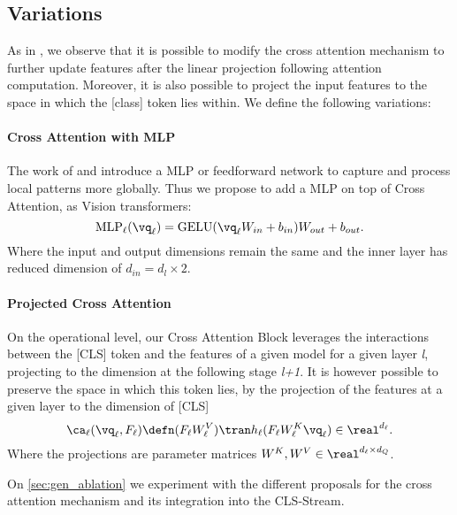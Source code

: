 \subsection{Variations}
\label{subsec:variations}

As in \cite{dosovitskiy2020image}, we observe that it is possible to modify the cross attention mechanism to further update features after the linear projection following attention computation. Moreover, it is also possible to project the input features to the space in which the [class] token lies within. We define the following variations:

\paragraph{Cross Attention with MLP}
The work of \cite{NIPS2017_3f5ee243} and \cite{dosovitskiy2020image} introduce a MLP or feedforward network to capture and process local patterns more globally. Thus we propose to add a MLP on top of Cross Attention, as Vision transformers:
\begin{equation}
    \mbox{MLP}_\ell(\vq_{\ell}) = \mbox{GELU}(\vq_\ell W_{in}+b_{in})W_{out}+b_{out}.
    \label{eq:mlp_ca}
\end{equation}
Where the input and output dimensions remain the same and the inner layer has reduced dimension of $d_{in} = d_l\times 2$.\\

\paragraph{Projected Cross Attention}
On the operational level, our Cross Attention Block leverages the interactions between the [CLS] token and the features of a given model for a given layer \textit{l}, projecting to the dimension at the following stage \textit{l+1}. It is however possible to preserve the space in which this token lies, by the projection of the features at a given layer to the dimension of [CLS]
\begin{equation}
    \ca_\ell(\vq_\ell, F_\ell) \defn (F_\ell W^V_\ell)\tran h_\ell(F_\ell W^K_\ell \vq_\ell)\in \real^{d_\ell}.
    \label{eq:proj_ca}
\end{equation}
Where the projections are parameter matrices $W^K, W^V \in \real^{d_\ell\times d_Q}$.

On \autoref{sec:gen_ablation} we experiment with the different proposals for the cross attention mechanism and its integration into the CLS-Stream.